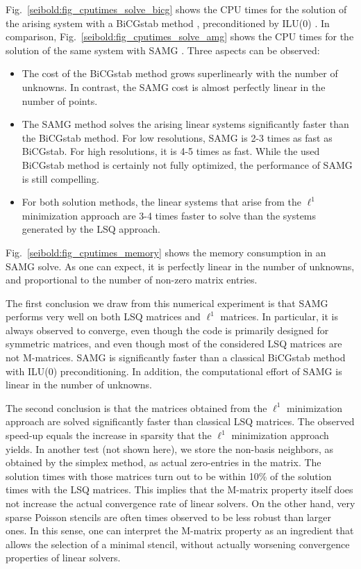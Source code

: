 \documentclass[reqno]{amsart}
\theoremstyle{plain}
\theoremstyle{definition}
\theoremstyle{remark}
\begin{document}
Fig.~\ref{seibold:fig_cputimes_solve_bicg} shows the CPU times for the solution of the
arising system with a BiCGstab method \cite{VanDerVorst1992},
preconditioned by ILU(0) \cite[Chap.~10]{Saad1996}.
In comparison, Fig.~\ref{seibold:fig_cputimes_solve_amg} shows the CPU times for the
solution of the same system with SAMG \cite{SAMG}.
Three aspects can be observed:
\begin{itemize}
\item
The cost of the BiCGstab method grows superlinearly with the number of unknowns.
In contrast, the SAMG cost is almost perfectly linear in the number of points.
\item
The SAMG method solves the arising linear systems significantly faster than the
BiCGstab method. For low resolutions, SAMG is 2-3 times as fast as BiCGstab.
For high resolutions, it is 4-5 times as fast.
While the used BiCGstab method is certainly not fully optimized, the performance
of SAMG is still compelling.
\item
For both solution methods, the linear systems that arise from the $\ell^1$ minimization
approach are 3-4 times faster to solve than the systems generated by the LSQ approach.
\end{itemize}
Fig.~\ref{seibold:fig_cputimes_memory} shows the memory consumption in an SAMG solve.
As one can expect, it is perfectly linear in the number of unknowns, and proportional
to the number of non-zero matrix entries.

The first conclusion we draw from this numerical experiment is that SAMG performs very
well on both LSQ matrices and $\ell^1$ matrices. In particular, it is always observed to
converge, even though the code is primarily designed for symmetric matrices, and even
though most of the considered LSQ matrices are not M-matrices. SAMG is significantly
faster than a classical BiCGstab method with ILU(0) preconditioning. In addition, the
computational effort of SAMG is linear in the number of unknowns.

The second conclusion is that the matrices obtained from the $\ell^1$ minimization
approach are solved significantly faster than classical LSQ matrices. The observed
speed-up equals the increase in sparsity that the $\ell^1$ minimization approach yields.
In another test (not shown here), we store the non-basis neighbors, as obtained by the
simplex method, as actual zero-entries in the matrix. The solution times with those
matrices turn out to be within 10\% of the solution times with the LSQ matrices.
This implies that the M-matrix property itself does not increase the actual convergence
rate of linear solvers. On the other hand, very sparse Poisson stencils are often
times observed to be less robust than larger ones. In this sense, one can interpret the
M-matrix property as an ingredient that allows the selection of a minimal stencil,
without actually worsening convergence properties of linear solvers.
\end{document}
